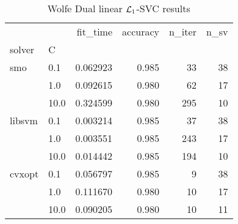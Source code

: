 \begin{table}[H]
\centering
\caption{Wolfe Dual linear $\protect \mathcal{L}_1$-SVC results}
\label{linear_dual_l1_svc_cv_results}
\begin{tabular}{llrrrr}
\toprule
       &      &  fit\_time &  accuracy &  n\_iter &  n\_sv \\
solver & C &           &           &         &       \\
\midrule
smo & 0.1  &  0.062923 &     0.985 &      33 &    38 \\
       & 1.0  &  0.092615 &     0.980 &      62 &    17 \\
       & 10.0 &  0.324599 &     0.980 &     295 &    10 \\
libsvm & 0.1  &  0.003214 &     0.985 &      37 &    38 \\
       & 1.0  &  0.003551 &     0.985 &     243 &    17 \\
       & 10.0 &  0.014442 &     0.985 &     194 &    10 \\
cvxopt & 0.1  &  0.056797 &     0.985 &       9 &    38 \\
       & 1.0  &  0.111670 &     0.980 &      10 &    17 \\
       & 10.0 &  0.090205 &     0.980 &      10 &    11 \\
\bottomrule
\end{tabular}
\end{table}
